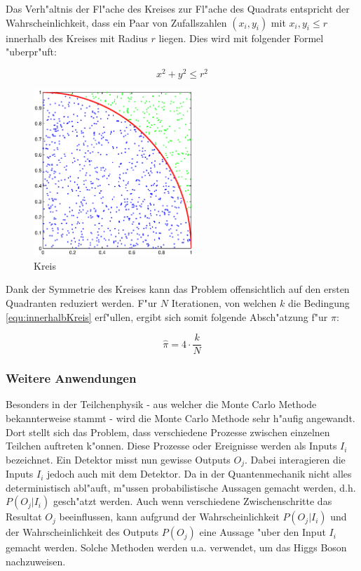 \begin{refsection}
Das Verh"altnis der Fl"ache des Kreises zur Fl"ache des Quadrats
entspricht der Wahrscheinlichkeit, dass ein Paar von Zufallszahlen
$(x_i,y_i)$ mit $x_i,y_i \leq r$ innerhalb des Kreises mit Radius $r$
liegen. Dies wird mit folgender Formel "uberpr"uft:

\begin{equation}
x^2 + y^2 \leq r^2
\label{equ:innerhalbKreis}
\end{equation}

\begin{figure}[htbp]
	\centering
	\includegraphics[width=6cm]{montecarlo/images/kreis_hitmiss.eps}
	\caption{Kreis}
	\label{fig:KreisHitMiss}
\end{figure}

Dank der Symmetrie des Kreises kann das Problem offensichtlich auf den
ersten Quadranten reduziert werden. F"ur $N$ Iterationen, von welchen
$k$ die Bedingung \ref{equ:innerhalbKreis} erf"ullen, ergibt sich somit
folgende Absch"atzung f"ur $\pi$:

\begin{equation}
	\hat{\pi} = 4 \cdot \frac{k}{N}
\end{equation}


\subsubsection{Weitere Anwendungen}
Besonders in der Teilchenphysik - aus welcher die Monte Carlo Methode
bekannterweise stammt - wird die Monte Carlo Methode sehr h"aufig
angewandt. Dort stellt sich das Problem, dass verschiedene Prozesse
zwischen einzelnen Teilchen auftreten k"onnen. Diese Prozesse oder
Ereignisse werden als Inputs $I_i$ bezeichnet. Ein Detektor misst nun
gewisse Outputs $O_j$. Dabei interagieren die Inputs $I_i$ jedoch auch
mit dem Detektor. Da in der Quantenmechanik nicht alles deterministisch
abl"auft, m"ussen probabilistische Aussagen gemacht werden, d.h. $P(O_j
| I_i)$ gesch"atzt werden. Auch wenn verschiedene Zwischenschritte das
Resultat $O_j$ beeinflussen, kann aufgrund der Wahrscheinlichkeit $P(O_j |
I_i)$ und der Wahrscheinlichkeit des Outputs $P(O_j)$ eine Aussage "uber
den Input $I_i$ gemacht werden. Solche Methoden werden u.a. verwendet,
um das Higgs Boson nachzuweisen. 


\end{refsection}
